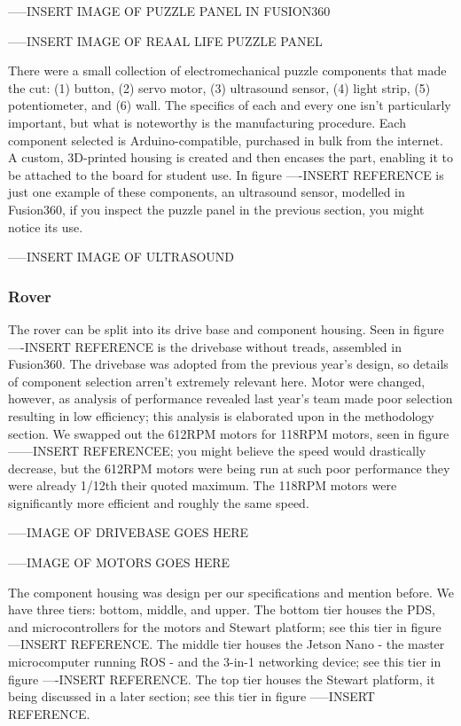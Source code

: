\documentclass[a4paper, 10pt]{article}
\begin{document}
		-----INSERT IMAGE OF PUZZLE PANEL IN FUSION360
		
		-----INSERT  IMAGE OF REAAL LIFE PUZZLE PANEL
		
		There were a small collection of electromechanical puzzle components that made the cut: (1) button, (2) servo motor, (3) ultrasound sensor, (4) light strip, (5) potentiometer, and (6) wall. The specifics of each and every one isn't particularly important, but what is noteworthy is the manufacturing procedure. Each component selected is Arduino-compatible, purchased in bulk from the internet. A custom, 3D-printed housing is created and then encases the part, enabling it to be attached to the board for student  use. In figure ----INSERT REFERENCE is just one example of these components, an ultrasound sensor, modelled in Fusion360, if you inspect the puzzle panel in the previous section, you might notice its use.
		
		-----INSERT IMAGE OF ULTRASOUND
 		
 		\subsubsection*{Rover}
		The rover can be split into its drive base and component housing. Seen in figure ----INSERT REFERENCE is the drivebase without treads, assembled in Fusion360. The drivebase was adopted from the previous year's design, so details of component selection arren't extremely relevant here. Motor were changed, however, as analysis of performance revealed last year's team made poor selection resulting in low efficiency; this analysis is elaborated upon in the methodology section. We swapped out the 612RPM motors for 118RPM motors, seen in figure ------INSERT REFERENCEE; you might believe the speed would drastically decrease, but the 612RPM motors were being run at such poor performance they were already 1/12th their quoted maximum. The 118RPM motors were significantly more efficient and roughly the same speed.
		
		-----IMAGE OF DRIVEBASE GOES HERE
		
		-----IMAGE OF MOTORS GOES HERE
		
		The component housing was design per our specifications and mention before. We have three tiers: bottom, middle, and upper. The bottom tier houses the PDS, and microcontrollers for the motors and Stewart platform; see this tier in figure ---INSERT  REFERENCE. The middle tier houses the Jetson Nano - the master microcomputer running ROS - and the 3-in-1 networking device; see this tier in figure ----INSERT REFERENCE. The top tier houses the Stewart platform, it being discussed in a later section; see this tier in figure -----INSERT REFERENCE.
		
\end{document}
